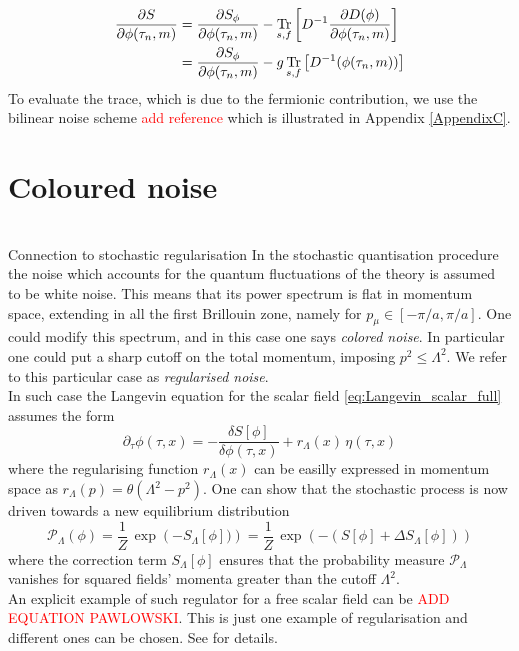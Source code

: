 \begin{equation}
    \begin{aligned}
        \frac{\partial S}{\partial \phi(\tau_n,m)} &= \frac{\partial S_\phi}{\partial \phi(\tau_n, m)} - \underset{s,f}{\operatorname{\text{Tr}}} \left[D^{-1} \frac{\partial D(\phi)}{\partial \phi(\tau_n, m)}\right] \\
        &= \frac{\partial S_\phi}{\partial \phi(\tau_n, m)} - g \, \underset{s,f}{\operatorname{\text{Tr}}} \left[D^{-1}(\phi(\tau_n,m))\right]
    \end{aligned}
    \label{eq:drift_continuum_full_theory}
\end{equation}
To evaluate the trace, which is due to the fermionic contribution, we use the bilinear noise scheme \textcolor{red}{add reference} which is illustrated in Appendix \ref{AppendixC}.



\section{Coloured noise}
\label{sec:coloured_noise}
 \\
Connection to stochastic regularisation \cite{}
In the stochastic quantisation procedure the noise which accounts for the quantum fluctuations of the theory is assumed to be white noise. This means that its power spectrum is flat in momentum space, extending in all the first Brillouin zone, namely for $p_\mu \in [-\pi/a, \pi/a]$. One could modify this spectrum, and in this case one says \emph{colored noise}. In particular one could put a sharp cutoff on the total momentum, imposing $p^2 \leq \Lambda^2$. We refer to this particular case as \emph{regularised noise}. \\
In such case the Langevin equation for the scalar field \eqref{eq:Langevin_scalar_full} assumes the form
\begin{equation*}
    \partial_\tau \phi(\tau, x) = - \frac{\delta S[\phi]}{\delta \phi (\tau, x)} + r_\Lambda (x) \, \eta (\tau, x)
    \label{eq:Langevin_scalar_regularised}
\end{equation*}
where the regularising function $r_\Lambda(x)$ can be easilly expressed in momentum space as $r_\Lambda(p) = \theta(\Lambda^2 - p^2)$. One can show \cite{Pawlowski2017CoolingNoise} that the stochastic process is now driven towards a new equilibrium distribution
\begin{equation}
    \mathcal{P}_\Lambda(\phi) = \frac{1}{Z} \, \exp\left(-S_\Lambda[\phi])\right) = \frac{1}{Z} \, \exp\left(-(S[\phi] + \Delta S_\Lambda[\phi])\right)
    \label{eq:probability_field_configuration_regularised}
\end{equation}
where the correction term $S_\Lambda[\phi]$ ensures that the probability measure $\mathcal{P}_\Lambda$ vanishes for squared fields' momenta greater than the cutoff $\Lambda^2$. \\
An explicit example of such regulator for a free scalar field can be \textcolor{red}{ADD EQUATION PAWLOWSKI}.
This is just one example of regularisation and different ones can be chosen. See \cite{Pawlowski2017CoolingNoise} for details.


